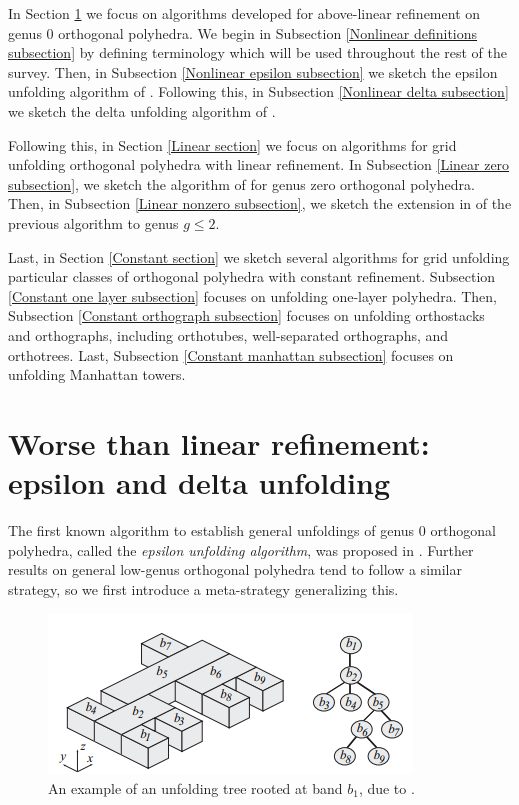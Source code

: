 \documentclass{article}
\begin{document}
In Section \ref{Nonlinear section} we focus on algorithms developed for above-linear refinement on genus 0 orthogonal polyhedra.
We begin in Subsection \ref{Nonlinear definitions subsection} by defining terminology which will be used throughout the rest of the survey.
Then, in Subsection \ref{Nonlinear epsilon subsection} we sketch the epsilon unfolding algorithm of \cite{Damian_Flatland_Orourke}.
Following this, in Subsection \ref{Nonlinear delta subsection} we sketch the delta unfolding algorithm of \cite{Damian_Demaine_Flatland}. 

Following this, in Section \ref{Linear section} we focus on algorithms for grid unfolding orthogonal polyhedra with linear refinement.
In Subsection \ref{Linear zero subsection}, we sketch the algorithm of \cite{Chang_Yen} for genus zero orthogonal polyhedra.
Then, in Subsection \ref{Linear nonzero subsection}, we sketch the extension in \cite{Damian_Demaine} of the previous algorithm to genus $g \leq 2$.

Last, in Section \ref{Constant section} we sketch several algorithms for grid unfolding particular classes of orthogonal polyhedra with constant refinement.
Subsection \ref{Constant one layer subsection} focuses on unfolding one-layer polyhedra.
Then, Subsection \ref{Constant orthograph subsection} focuses on unfolding orthostacks and orthographs, including orthotubes, well-separated orthographs, and orthotrees.
Last, Subsection \ref{Constant manhattan subsection} focuses on unfolding Manhattan towers.

\section{Worse than linear refinement: epsilon and delta unfolding} \label{Nonlinear section}
The first known algorithm to establish general unfoldings of genus 0 orthogonal polyhedra, called the \emph{epsilon unfolding algorithm}, was proposed in \cite{Damian_Flatland_Orourke}.
Further results on general low-genus orthogonal polyhedra tend to follow a similar strategy, so we first introduce a meta-strategy generalizing this.

\begin{figure}
  \begin{center}
    \includegraphics[width=.7\textwidth]{./figs/Unfolding_tree.png}
  \end{center}
  \caption{
    An example of an unfolding tree rooted at band $b_1$, due to \cite[Fig. 2]{Damian_Flatland_Orourke}.
  }\label{Unfolding tree figure}
\end{figure}
\end{document}
